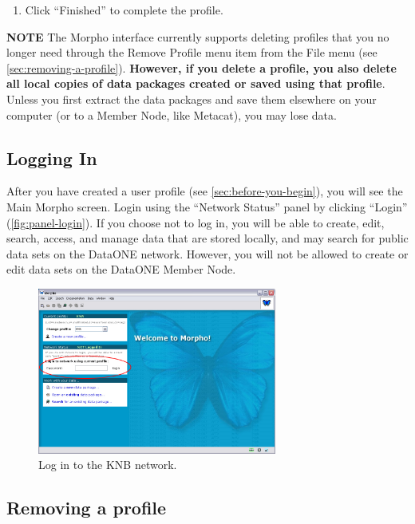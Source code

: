 \begin{enumerate}
  \item Click ``Finished'' to complete the profile.
\end{enumerate}

\begin{shaded}
  \textbf{NOTE} The Morpho interface currently supports deleting
  profiles that you no longer need through the Remove Profile menu item
  from the File menu (see \autoref{sec:removing-a-profile}).
   \textbf{However, if you delete a profile, you also
  delete all local copies of data packages created or saved using that
  profile}. Unless you first extract the data packages and save them
  elsewhere on your computer (or to a Member Node, like Metacat), you
  may lose data.
\end{shaded}

\subsection{Logging In}

After you have created a user profile (see
\autoref{sec:before-you-begin}), you will see the Main Morpho screen.
Login using the ``Network Status'' panel by clicking
``Login'' (\autoref{fig:panel-login}). If you choose not to log in, you
will be able to create, edit, search, access, and manage data that are
stored locally, and may search for public data sets on the DataONE network.
However, you will not be allowed to create or edit data sets on the DataONE
Member Node.

\begin{figure}
  \centering
    \includegraphics[width=0.7\textwidth]{images/panel-login.jpg}
  \caption{Log in to the KNB network.}
  \label{fig:panel-login}
\end{figure}

\subsection{Removing a profile} \label{sec:removing-a-profile}

